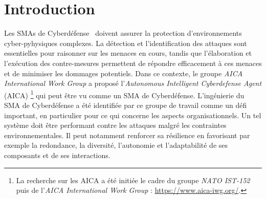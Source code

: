 








\section{Introduction}


Les SMAs de Cyberdéfense~\cite{Kott2023, Singh2015} doivent assurer la protection d'environnements cyber-pyhysiques complexes.  La détection et l'identification des attaques sont essentielles pour raisonner sur les menaces en cours, tandis que l'élaboration et l'exécution des contre-mesures permettent de répondre efficacement à ces menaces et de minimiser les dommages potentiels. Dans ce contexte, le groupe \emph{AICA International Work Group} a proposé l'\emph{Autonomous Intelligent Cyberdefense Agent} (AICA)
\footnote{La recherche sur les AICA a été initiée le cadre du groupe \emph{NATO IST-152} puis de l'\emph{AICA International Work Group} : \url{https://www.aica-iwg.org/}. }
qui peut être vu comme un SMA de Cyberdéfense. L'ingénierie du SMA de Cyberdéfense a été identifiée par ce groupe de travail comme un défi important, en particulier pour ce qui concerne les aspects organisationnels. %
Un tel système doit être performant contre les attaques malgré les contraintes environnementales. Il peut notamment renforcer sa résilience en favorisant par exemple la redondance, la diversité, l'autonomie et l'adaptabilité de ses composants et de ses interactions.

